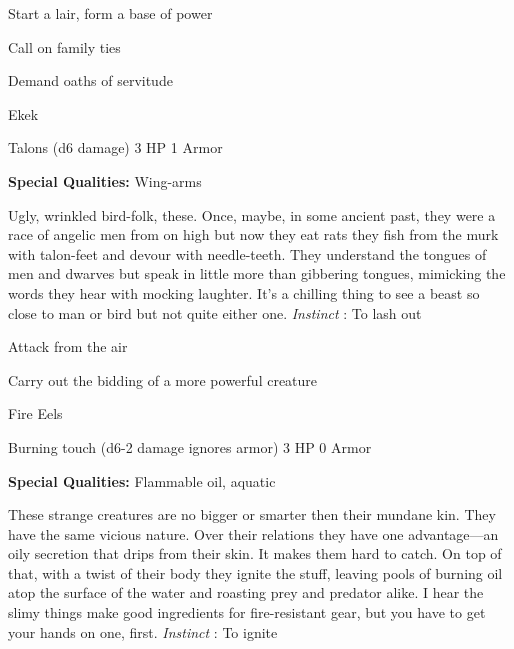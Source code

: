 \startitemize[1,packed]

\item Start a lair, form a base of power

 
\item Call on family ties

 
\item Demand oaths of servitude


\stopitemize
 
\startMonsterName
Ekek	 
\stopMonsterName
 

Talons (d6 damage)	3 HP	1 Armor

 


 
\startMonsterQualities
{\bf Special Qualities:}  Wing-arms
\stopMonsterQualities
 
\startMonsterDescription
Ugly, wrinkled bird-folk, these. Once, maybe, in some ancient past, they were a race of angelic men from on high but now they eat rats they fish from the murk with talon-feet and devour with needle-teeth. They understand the tongues of men and dwarves but speak in little more than gibbering tongues, mimicking the words they hear with mocking laughter. It’s a chilling thing to see a beast so close to man or bird but not quite either one. {\em Instinct} : To lash out
\stopMonsterDescription
 
\startitemize[1,packed]

\item Attack from the air

 
\item Carry out the bidding of a more powerful creature


\stopitemize
 
\startMonsterName
Fire Eels	 
\stopMonsterName
 

Burning touch (d6-2 damage ignores armor)	3 HP	0 Armor

 


 
\startMonsterQualities
{\bf Special Qualities:}  Flammable oil, aquatic
\stopMonsterQualities
 
\startMonsterDescription
These strange creatures are no bigger or smarter then their mundane kin. They have the same vicious nature. Over their relations they have one advantage—an oily secretion that drips from their skin. It makes them hard to catch. On top of that, with a twist of their body they ignite the stuff, leaving pools of burning oil atop the surface of the water and roasting prey and predator alike. I hear the slimy things make good ingredients for fire-resistant gear, but you have to get your hands on one, first. {\em Instinct} : To ignite
\stopMonsterDescription
 
